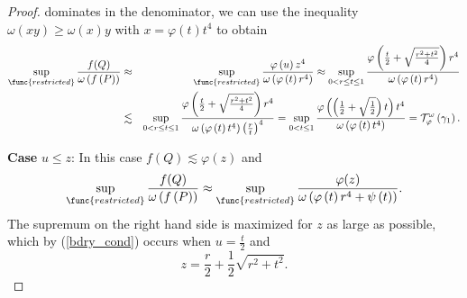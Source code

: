 \documentclass{amsart}
\theoremstyle{plain}
\numberwithin{equation}{section}
\begin{document}
\begin{proof}
dominates in the denominator, we can use the inequality $\omega \left(
xy\right) \geq \omega \left( x\right) y$ with $x=\varphi \left( t\right)
t^{4}$ to obtain%
\begin{eqnarray*}
\sup_{\func{restricted}}\frac{f(Q)}{\omega \left( f\left( P\right) \right) }
&\approx &\sup_{\func{restricted}}\frac{\varphi \left( u\right) z^{4}}{%
\omega \left( \varphi \left( t\right) r^{4}\right) }\approx \sup_{0<r\leq
t\leq 1}\frac{\varphi \left( \frac{t}{2}+\sqrt{\frac{r^{2}+t^{2}}{4}}\right)
r^{4}}{\omega \left( \varphi \left( t\right) r^{4}\right) } \\
&\lesssim &\sup_{0<r\leq t\leq 1}\frac{\varphi \left( \frac{t}{2}+\sqrt{%
\frac{r^{2}+t^{2}}{4}}\right) r^{4}}{\omega \left( \varphi \left( t\right)
t^{4}\right) \left( \frac{r}{t}\right) ^{4}}=\sup_{0<t\leq 1}\frac{\varphi
\left( \left( \frac{1}{2}+\sqrt{\frac{1}{2}}\right) t\right) t^{4}}{\omega
\left( \varphi \left( t\right) t^{4}\right) }=\mathcal{T}_{\varphi }^{\omega
}\left( \gamma _{1}\right) .
\end{eqnarray*}

\textbf{Case }$u\leq z$: In this case $f\left( Q\right) \lesssim \varphi (z)$
and 
\begin{equation*}
\sup_{\func{restricted}}\frac{f(Q)}{\omega \left( f\left( P\right) \right) }%
\approx \sup_{\func{restricted}}\frac{\varphi (z)}{\omega \left( \varphi
\left( t\right) r^{4}+\psi \left( t\right) \right) }.
\end{equation*}%
The supremum on the right hand side is maximized for $z$ as large as
possible, which by (\ref{bdry_cond}) occurs when $u=\frac{t}{2}$ and 
\begin{equation*}
z=\frac{r}{2}+\frac{1}{2}\sqrt{r^{2}+t^{2}}.
\end{equation*}


\end{proof}
\end{document}

